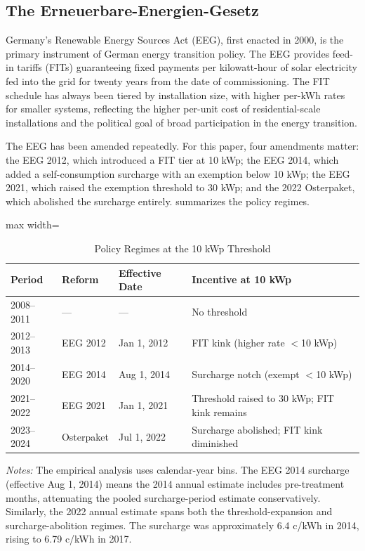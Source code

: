 \documentclass[12pt]{article}
\begin{document}
\subsection{The Erneuerbare-Energien-Gesetz}

Germany's Renewable Energy Sources Act (EEG), first enacted in 2000, is the primary instrument of German energy transition policy. The EEG provides feed-in tariffs (FITs) guaranteeing fixed payments per kilowatt-hour of solar electricity fed into the grid for twenty years from the date of commissioning. The FIT schedule has always been tiered by installation size, with higher per-kWh rates for smaller systems, reflecting the higher per-unit cost of residential-scale installations and the political goal of broad participation in the energy transition.

The EEG has been amended repeatedly. For this paper, four amendments matter: the EEG 2012, which introduced a FIT tier at 10 kWp; the EEG 2014, which added a self-consumption surcharge with an exemption below 10 kWp; the EEG 2021, which raised the exemption threshold to 30 kWp; and the 2022 Osterpaket, which abolished the surcharge entirely.  summarizes the policy regimes.

\begin{table}[t]
\centering
\caption{Policy Regimes at the 10 kWp Threshold}
\label{tab:regimes}
\begin{adjustbox}{max width=\textwidth}
\begin{tabular}{llll}
\toprule
Period & Reform & Effective Date & Incentive at 10 kWp \\
\midrule
2008--2011 & --- & --- & No threshold \\
2012--2013 & EEG 2012 & Jan 1, 2012 & FIT kink (higher rate $<$10 kWp) \\
2014--2020 & EEG 2014 & Aug 1, 2014 & Surcharge notch (exempt $<$10 kWp) \\
2021--2022 & EEG 2021 & Jan 1, 2021 & Threshold raised to 30 kWp; FIT kink remains \\
2023--2024 & Osterpaket & Jul 1, 2022 & Surcharge abolished; FIT kink diminished \\
\bottomrule
\end{tabular}
\end{adjustbox}

\vspace{0.5em}
\begin{flushleft}\small \textit{Notes:} The empirical analysis uses calendar-year bins. The EEG 2014 surcharge (effective Aug 1, 2014) means the 2014 annual estimate includes pre-treatment months, attenuating the pooled surcharge-period estimate conservatively. Similarly, the 2022 annual estimate spans both the threshold-expansion and surcharge-abolition regimes. The surcharge was approximately 6.4 c/kWh in 2014, rising to 6.79 c/kWh in 2017.\end{flushleft}
\end{table}
\end{document}
